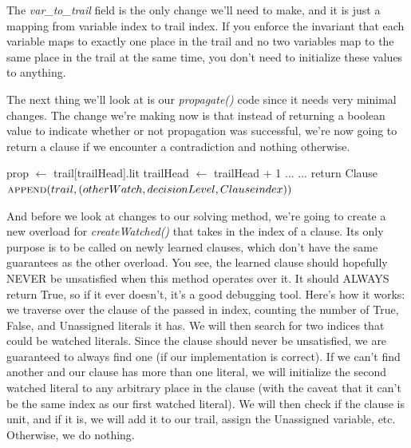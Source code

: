 The \textit{var\_to\_trail} field is the only change we'll need to make, and it 
is just a mapping from variable index to trail index. If you enforce the invariant 
that each variable maps to exactly one place in the trail and no two variables 
map to the same place in the trail at the same time, you don't need to initialize 
these values to anything. 

The next thing we'll look at is our \textit{propagate()} code since it needs very 
minimal changes. The change we're making now is that instead of returning a boolean
value to indicate whether or not propagation was successful, we're now going to return 
a clause if we encounter a contradiction and nothing otherwise.

\begin{algorithm}[H]
\caption{Updated Propagate}\label{alg:28}
\begin{algorithmic}[1]

    \State prop $\gets$ trail[trailHead].lit
    \State trailHead $\gets$ trailHead + 1
    \State ...
        \State ... 
                return Clause
            \Else
                \State $\Call{append}{trail, (otherWatch, decisionLevel, Clause index)}$
            \EndIf
        \EndIf
    \EndFor
\EndWhile

\EndProcedure
\end{algorithmic}
\end{algorithm}

And before we look at changes to our solving method, we're going to create a new 
overload for \textit{createWatched()} that takes in the index of a clause. Its 
only purpose is to be called on newly learned clauses, which don't have the same 
guarantees as the other overload. You see, the learned clause should hopefully 
NEVER be unsatisfied when this method operates over it. It should ALWAYS return 
True, so if it ever doesn't, it's a good debugging tool. Here's how it works:
we traverse over the clause of the passed in index, counting the number of 
True, False, and Unassigned literals it has. We will then search for two 
indices that could be watched literals. Since the clause should never be 
unsatisfied, we are guaranteed to always find one (if our implementation is correct).
If we can't find another and our clause has more than one literal, we will initialize 
the second watched literal to any arbitrary place in the clause (with the caveat 
that it can't be the same index as our first watched literal). We will then check if the 
clause is unit, and if it is, we will add it to our trail, assign the Unassigned variable,
etc. Otherwise, we do nothing.

